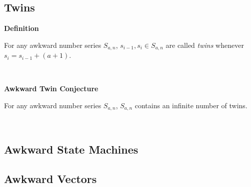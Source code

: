 \documentclass[a4paper,12pt]{article}
\begin{document}
\subsection{Twins}
\label{subsection:twins}





\label{definition:twins}
\hypertarget{definition:twins}{}
\begin{tcolorbox}
\textbf{Definition}

For any awkward number series $S_{a,n}$, $s_{i - 1}, s_i \in S_{a,n}$ are called \textit{twins} whenever $s_i = s_{i - 1} + (a + 1)$.

\end{tcolorbox}
\noindent \\










\label{conjecture:twin_conjecture}
\hypertarget{conjecture:twin_conjecture}{}
\begin{tcolorbox}
\textbf{Awkward Twin Conjecture}

For any awkward number series $S_{a,n}$, $S_{a, n}$ contains an infinite number of twins.

\end{tcolorbox}
\noindent \\













\subsection{Awkward State Machines}
\label{subsection:awkward_state_machines}










\subsection{Awkward Vectors}
\label{subsection:awkward_vectors}
\end{document}
